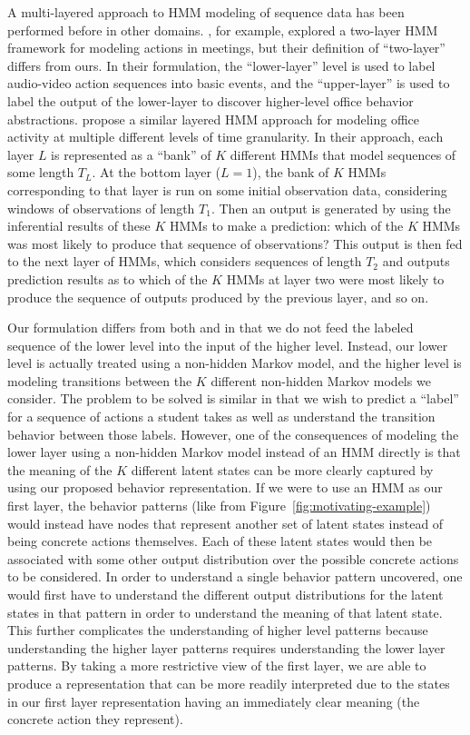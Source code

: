 A multi-layered approach to HMM modeling of sequence data has been
performed before in other domains. \citet{Zhang:2004:CVPR}, for example,
explored a two-layer HMM framework for modeling actions in meetings, but
their definition of ``two-layer'' differs from ours. In their formulation,
the ``lower-layer'' level is used to label audio-video action sequences
into basic events, and the ``upper-layer'' is used to label the output of
the lower-layer to discover higher-level office behavior abstractions.
\citet{Oliver:2004:CVIU} propose a similar layered HMM approach
for modeling office activity at multiple different levels of time
granularity. In their approach, each layer $L$ is represented as a ``bank''
of $K$ different HMMs that model sequences of some length $T_L$. At the
bottom layer ($L = 1$), the bank of $K$ HMMs corresponding to that layer is
run on some initial observation data, considering windows of observations
of length $T_1$. Then an output is generated by using the inferential
results of these $K$ HMMs to make a prediction: which of the $K$ HMMs was
most likely to produce that sequence of observations? This output is then
fed to the next layer of HMMs, which considers sequences of length $T_2$
and outputs prediction results as to which of the $K$ HMMs at layer two
were most likely to produce the sequence of outputs produced by the
previous layer, and so on.

Our formulation differs from both \citet{Zhang:2004:CVPR} and
\citet{Oliver:2004:CVIU} in that we do not feed the labeled sequence of the
lower level into the input of the higher level. Instead, our lower level is
actually treated using a non-hidden Markov model, and the higher level is
modeling transitions between the $K$ different non-hidden Markov models we
consider. The problem to be solved is similar in that we wish to predict a
``label'' for a sequence of actions a student takes as well as understand
the transition behavior between those labels.  However, one of the
consequences of modeling the lower layer using a non-hidden Markov model
instead of an HMM directly is that the meaning of the $K$ different latent
states can be more clearly captured by using our proposed behavior
representation. If we were to use an HMM as our first layer, the behavior
patterns (like from Figure~\ref{fig:motivating-example}) would instead have
nodes that represent another set of latent states instead of being concrete
actions themselves. Each of these latent states would then be associated
with some other output distribution over the possible concrete actions to
be considered. In order to understand a single behavior pattern uncovered,
one would first have to understand the different output distributions for
the latent states in that pattern in order to understand the meaning of
that latent state. This further complicates the understanding of higher
level patterns because understanding the higher layer patterns requires
understanding the lower layer patterns. By taking a more restrictive view
of the first layer, we are able to produce a representation that can be
more readily interpreted due to the states in our first layer
representation having an immediately clear meaning (the concrete action
they represent).

